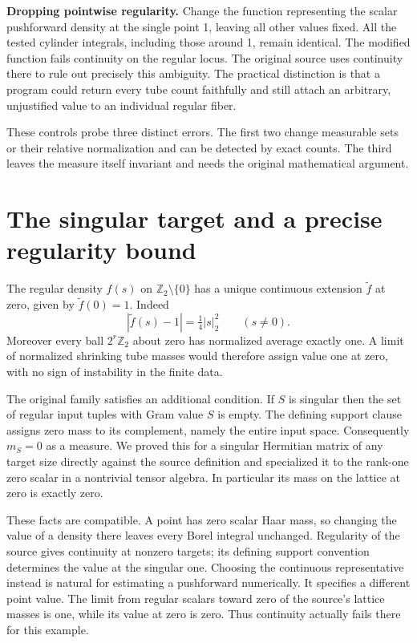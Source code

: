 \documentclass[12pt,letterpaper]{article}
\begin{document}
\textbf{Dropping pointwise regularity.} Change the function representing the scalar pushforward density at the single point 1, leaving all other values fixed. All the tested cylinder integrals, including those around 1, remain identical. The modified function fails continuity on the regular locus. The original source uses continuity there to rule out precisely this ambiguity. The practical distinction is that a program could return every tube count faithfully and still attach an arbitrary, unjustified value to an individual regular fiber.

These controls probe three distinct errors. The first two change measurable sets or their relative normalization and can be detected by exact counts. The third leaves the measure itself invariant and needs the original mathematical argument.

\clearpage\section{The singular target and a precise regularity bound}\label{zero}
The regular density \(f(s)\) on \(\mathbb Z_2\setminus\{0\}\) has a unique continuous extension \(\widetilde f\) at zero, given by \(\widetilde f(0)=1\). Indeed
\[
             |\widetilde f(s)-1|=\tfrac14 |s|_2^2
                      \qquad(s\ne0).
\]
Moreover every ball \(2^r\mathbb Z_2\) about zero has normalized average exactly one. A limit of normalized shrinking tube masses would therefore assign value one at zero, with no sign of instability in the finite data.

The original family satisfies an additional condition. If \(S\) is singular then the set of regular input tuples with Gram value \(S\) is empty. The defining support clause assigns zero mass to its complement, namely the entire input space. Consequently \(m_S=0\) as a measure. We proved this for a singular Hermitian matrix of any target size directly against the source definition and specialized it to the rank-one zero scalar in a nontrivial tensor algebra. In particular its mass on the lattice at zero is exactly zero.

These facts are compatible. A point has zero scalar Haar mass, so changing the value of a density there leaves every Borel integral unchanged. Regularity of the source gives continuity at nonzero targets; its defining support convention determines the value at the singular one. Choosing the continuous representative instead is natural for estimating a pushforward numerically. It specifies a different point value. The limit from regular scalars toward zero of the source's lattice masses is one, while its value at zero is zero. Thus continuity actually fails there for this example.
\end{document}
